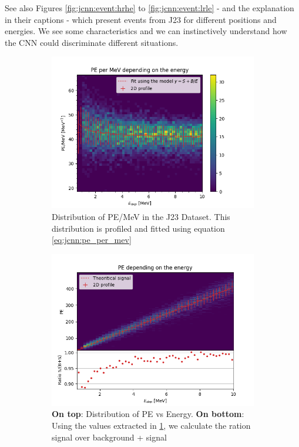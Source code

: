 \documentclass[../main.tex]{subfiles}
\begin{document}
{{See also Figures \ref{fig:jcnn:event:hrhe} to \ref{fig:jcnn:event:lrle} - and the explanation in their captions -  which present events from J23 for different positions and energies. We see some characteristics and we can instinctively understand how the CNN could discriminate different situations.

\begin{figure}[ht]
  \begin{subfigure}[t]{0.48\linewidth}
    \centering
    \includegraphics[width=\textwidth]{images/jcnn/pe_mev.png}
    \caption{Distribution of PE/MeV in the J23 Dataset. This distribution is profiled and fitted using equation \ref{eq:jcnn:pe_per_mev}}
    \label{fig:jcnn:pe_per_mev}
  \end{subfigure}
  \hfill
  \begin{subfigure}[t]{0.48\linewidth}
    \centering
    \includegraphics[width=\textwidth]{images/jcnn/pe_vs_mev.png}
    \caption{\textbf{On top}: Distribution of PE vs Energy. \textbf{On bottom}: Using the values extracted in \ref{fig:jcnn:pe_per_mev}, we calculate the ration signal over background + signal}
    \label{fig:jcnn:pe_vs_mev}
  \end{subfigure}
  \caption{}
\end{figure}

}}
\end{document}
